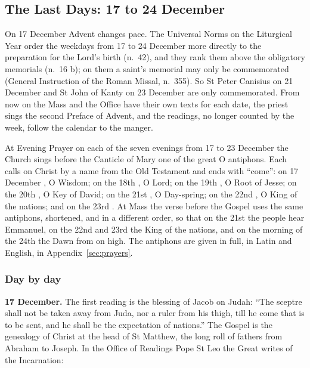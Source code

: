 \subsection{The Last Days: 17 to 24 December}\label{sec:last-days}

On 17 December Advent changes pace. The Universal Norms on the Liturgical Year
order the weekdays from 17 to 24 December more directly to the preparation for
the Lord's birth (n.~42), and they rank them above the obligatory memorials
(n.~16 b); on them a saint's memorial may only be commemorated (General
Instruction of the Roman Missal, n.~355). So St Peter
Canisius on 21 December and St John of Kanty on 23 December are only
commemorated. From now on the Mass and the Office have their own texts for each
date, the priest sings the second Preface of Advent, and the readings, no longer
counted by the week, follow the calendar to the manger.

At Evening Prayer on each of the seven evenings from 17 to 23 December the
Church sings before the Canticle of Mary one of the great O antiphons. Each
calls on Christ by a name from the Old Testament and ends with ``come'': on 17
December , O Wisdom; on the 18th , O Lord; on the
19th , O Root of Jesse; on the 20th ,
O Key of David; on the 21st , O Day-spring; on the 22nd , O King of the nations; and on the 23rd . At Mass the
verse before the Gospel uses the same antiphons, shortened, and in a different
order, so that on the 21st the people hear
Emmanuel, on the 22nd and 23rd the King of the nations, and on the morning of
the 24th the Dawn from on high. The antiphons are given in full, in Latin and
English, in Appendix~\ref{sec:prayers}.

\subsubsection*{Day by day}

\textbf{17 December.} The first reading is the blessing of Jacob on Judah: ``The
sceptre shall not be taken away from Juda, nor a ruler from his thigh, till he
come that is to be sent, and he shall be the expectation of nations.'' The Gospel
is the genealogy of Christ at the head of St Matthew, the long roll of fathers
from Abraham to Joseph. In the Office of Readings Pope St Leo the Great writes
of the Incarnation:

